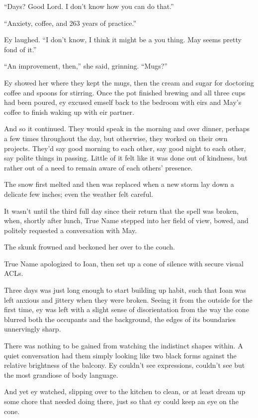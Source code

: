 ``Days? Good Lord. I don't know how you can do that.''

``Anxiety, coffee, and 263 years of practice.''

Ey laughed. ``I don't know, I think it might be a you thing. May seems pretty fond of it.''

``An improvement, then,'' she said, grinning. ``Mugs?''

Ey showed her where they kept the mugs, then the cream and sugar for doctoring coffee and spoons for stirring. Once the pot finished brewing and all three cups had been poured, ey excused emself back to the bedroom with eirs and May's coffee to finish waking up with eir partner.

And so it continued. They would speak in the morning and over dinner, perhaps a few times throughout the day, but otherwise, they worked on their own projects. They'd say good morning to each other, say good night to each other, say polite things in passing. Little of it felt like it was done out of kindness, but rather out of a need to remain aware of each others' presence.

The snow first melted and then was replaced when a new storm lay down a delicate few inches; even the weather felt careful.

It wasn't until the third full day since their return that the spell was broken, when, shortly after lunch, True Name stepped into her field of view, bowed, and politely requested a conversation with May.

The skunk frowned and beckoned her over to the couch.

True Name apologized to Ioan, then set up a cone of silence with secure visual ACLs.

Three days was just long enough to start building up habit, such that Ioan was left anxious and jittery when they were broken. Seeing it from the outside for the first time, ey was left with a slight sense of disorientation from the way the cone blurred both the occupants and the background, the edges of its boundaries unnervingly sharp.

There was nothing to be gained from watching the indistinct shapes within. A quiet conversation had them simply looking like two black forms against the relative brightness of the balcony. Ey couldn't see expressions, couldn't see but the most grandiose of body language.

And yet ey watched, slipping over to the kitchen to clean, or at least dream up some chore that needed doing there, just so that ey could keep an eye on the cone.

